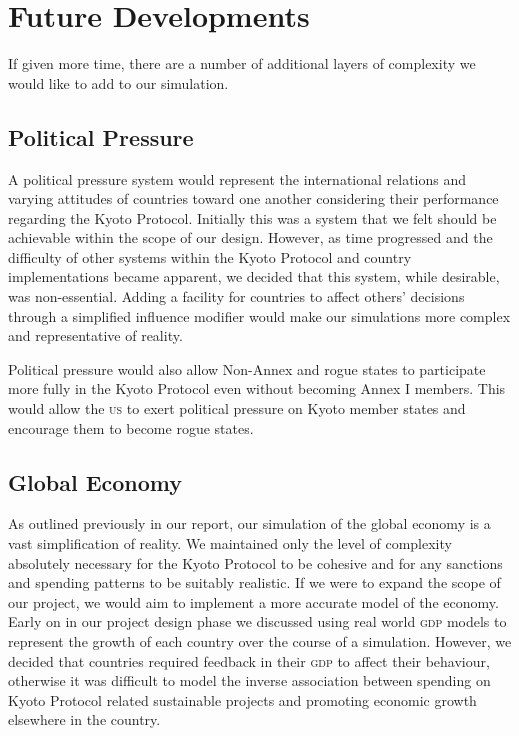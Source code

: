 \section{Future Developments}

If given more time, there are a number of additional layers of complexity we would like to add to our simulation. 

\subsection{Political Pressure}

A political pressure system would represent the international relations and varying attitudes of countries toward one another considering their performance regarding the Kyoto Protocol. Initially this was a system that we felt should be achievable within the scope of our design. However, as time progressed and the difficulty of other systems within the Kyoto Protocol and country implementations became apparent, we decided that this system, while desirable, was non-essential. Adding a facility for countries to affect others' decisions through a simplified influence modifier would make our simulations more complex and representative of reality.

Political pressure would also allow Non-Annex and rogue states to participate more fully in the Kyoto Protocol even without becoming Annex I members. This would allow the \textsc{us} to exert political pressure on Kyoto member states and encourage them to become rogue states.

\subsection{Global Economy}

As outlined previously in our report, our simulation of the global economy is a vast simplification of reality. We maintained only the level of complexity absolutely necessary for the Kyoto Protocol to be cohesive and for any sanctions and spending patterns to be suitably realistic. If we were to expand the scope of our project, we would aim to implement a more accurate model of the economy. Early on in our project design phase we discussed using real world \textsc{gdp} models to represent the growth of each country over the course of a simulation. However, we decided that countries required feedback in their \textsc{gdp} to affect their behaviour, otherwise it was difficult to model the inverse association between spending on Kyoto Protocol related sustainable projects and promoting economic growth elsewhere in the country.


